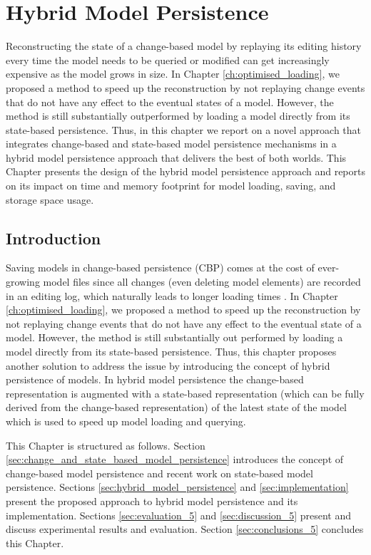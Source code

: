 \chapter{Hybrid Model Persistence}
\label{ch:hybrid_model_persistence}

Reconstructing the state of a change-based model by replaying its editing history every time the model needs to be queried or modified can get increasingly expensive as the model grows in size. In Chapter \ref{ch:optimised_loading}, we proposed a method to speed up the reconstruction by not replaying change events that do not have any effect to the eventual states of a model. However, the method is still substantially outperformed by loading a model directly from its state-based persistence. Thus, in this chapter we report on a novel approach that integrates change-based and state-based model persistence mechanisms in a hybrid model persistence approach that delivers the best of both worlds. This Chapter presents the design of the hybrid model persistence approach and reports on its impact on time and memory footprint for model loading, saving, and storage space usage.

\section{Introduction}
\label{sec:introduction_5}
Saving models in change-based persistence (CBP) comes at the cost of ever-growing model files \cite{DBLP:conf/edoc/KoegelHLHD10,DBLP:journals/entcs/RobbesL07} since all changes (even deleting model elements) are recorded in an editing log, which naturally leads to longer loading times \cite{mens2002state}. 
In Chapter \ref{ch:optimised_loading}, we proposed a method to speed up the reconstruction by not replaying change events that do not have any effect to the eventual state of a model. However, the method is still substantially out performed by loading a model directly from its state-based persistence. Thus, this chapter proposes another solution to address the issue by introducing the concept of hybrid persistence of models. In hybrid model persistence the change-based representation is augmented with a state-based representation (which can be fully derived from the change-based representation) of the latest state of the model which is used to speed up model loading and querying.

This Chapter is structured as follows. Section \ref{sec:change_and_state_based_model_persistence} introduces the concept of change-based model persistence and recent work on state-based model persistence. Sections \ref{sec:hybrid_model_persistence} and \ref{sec:implementation} present the proposed approach to hybrid model persistence and its implementation. Sections \ref{sec:evaluation_5} and \ref{sec:discussion_5} present and discuss experimental results and evaluation. Section \ref{sec:conclusions_5} concludes this Chapter.

